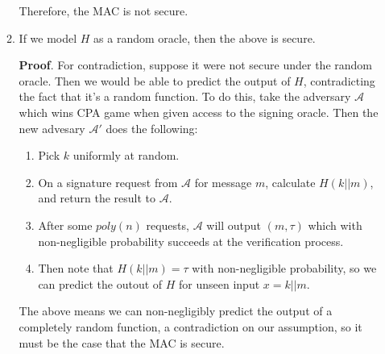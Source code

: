 \documentclass{article}
\begin{document}
\begin{enumerate}
\begin{enumerate}[,label=\alph*.]
Therefore, the MAC is not secure.%

\item{}
If we model $H$ as a random oracle, then the above is secure.%

\begin{mdbmarginx}{1ex}{0pt}{1ex}{0pt}%
\noindent{}\textbf{Proof}.  For contradiction, suppose it were not secure under the random oracle. Then we would
be able to predict the output of $H$, contradicting the fact that it's a random function.
To do this, take the adversary $\mathcal{A}$ which wins CPA game when given access to the 
signing oracle. Then the new advesary $\mathcal{A}'$ does the following:%

\begin{enumerate}[noitemsep,topsep=\mdcompacttopsep]%

\item{}Pick $k$ uniformly at random.%

\item{}On a signature request from $\mathcal{A}$ for message $m$, calculate $H(k || m)$, and return the result to $\mathcal{A}$.%

\item{}After some $poly(n)$ requests, $\mathcal{A}$ will output $(m,\tau)$ which with non-negligible
probability succeeds at the verification process.%

\item{}Then note that $H(k || m) = \tau$ with non-negligible probability, so we can predict the outout
of $H$ for unseen input $x = k || m$.%
\end{enumerate}%
\end{mdbmarginx}%

The above means we can non-negligibly predict the output of a completely random function, a
contradiction on our assumption, so it must be the case that the MAC is secure.%
\end{enumerate}%
\end{enumerate}%
\end{document}
